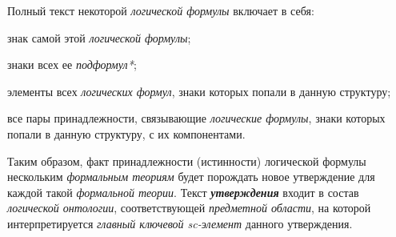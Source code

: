 \begin{SCn}
{Полный текст некоторой \textit{логической формулы} включает в себя:
\begin{scnitemize}
    \item знак самой этой \textit{логической формулы};
    \item знаки всех ее \textit{подформул*};
    \item элементы всех \textit{логических формул}, знаки которых попали в данную структуру;
    \item все пары принадлежности, связывающие \textit{логические формулы}, знаки которых попали в данную структуру, с их компонентами.
\end{scnitemize}
Таким образом, факт принадлежности (истинности) логической формулы нескольким \textit{формальным теориям} будет порождать новое утверждение для каждой такой \textit{формальной теории}. Текст \textbf{\textit{утверждения}} входит в состав \textit{логической онтологии}, соответствующей \textit{предметной области}, на которой интерпретируется \textit{главный ключевой sc-элемент\scnrolesign} данного утверждения.}


\end{SCn}
